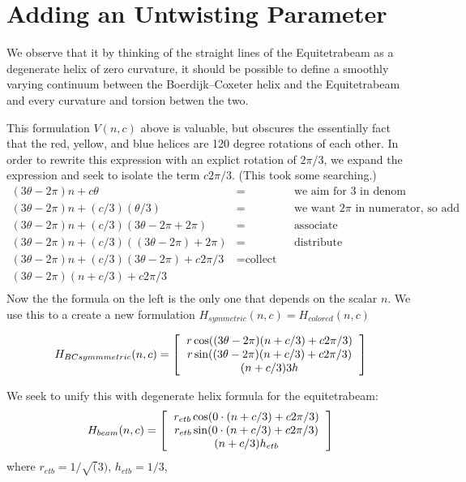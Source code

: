 \documentclass[11pt]{article}
\begin{document}
\section{Adding an Untwisting Parameter}

We observe that it by thinking of the straight lines of the Equitetrabeam as a degenerate helix of zero curvature,
it should be possible to define a smoothly varying continuum between the Boerdijk--Coxeter helix and the Equitetrabeam and every
curvature and torsion betwen the two.

This formulation $V(n,c)$ above is valuable, but obscures the essentially fact that the red, yellow, and blue helices are 120 degree rotations
of each other. In order to rewrite this expression with an explict rotation of $2\pi/3$, we expand 
the expression and seek to isolate the term $c2\pi/3$. (This took some searching.)
\begin{align*}
  (3 \theta - 2 \pi)n + c \theta  &=  & \text{we aim for 3 in denom} \\
    (3 \theta - 2 \pi)n + (c/3)  (\theta /3)  &=  & \text{we want $2\pi$ in numerator, so add canceling terms} \\
  (3 \theta - 2 \pi)n + (c/ 3) (3 \theta - 2 \pi  + 2 \pi) &= & \text{associate} \\
  (3 \theta - 2 \pi)n + (c/ 3) ((3 \theta - 2 \pi)  + 2 \pi) &= & \text{distribute} \\  
  (3 \theta - 2 \pi)n + (c / 3) (3 \theta - 2 \pi)  + c 2 \pi /3 &=  \text{collect like factors} \\
  (3 \theta - 2 \pi)(n + c/3)  + c 2 \pi /3  \\
\end{align*}
Now the the formula on the left is the only one that depends on the scalar $n$. We use this to a create
a new formulation $H_{symmetric}(n,c) = H_{colored}(n,c)$

\[
H_{BCsymmmetric}(n,c) =
\left [
  \begin{tabular}{c}
   $ r  \cos((3 \theta - 2 \pi)(n + c/3)  + c 2 \pi /3) $\\
   $ r  \sin((3 \theta - 2 \pi)(n + c/3)  + c 2 \pi /3) $\\
   $ (n + c/3) 3  h $
  \end{tabular}
\right ]
\]

We seek to unify this with degenerate helix formula for the equitetrabeam:
\[
H_{beam}(n,c) =
\left [
  \begin{tabular}{c}
   $ r_{etb}  \cos( 0 \cdot (n + c/3)  + c 2 \pi /3) $\\
   $ r_{etb}  \sin( 0 \cdot (n + c/3)  + c 2 \pi /3) $\\
   $ (n + c/3) h_{etb} $
  \end{tabular}
\right ]  
\]
where $ r_{etb} = 1/\sqrt(3)$, $h_{etb} = 1/3$,
\end{document}
